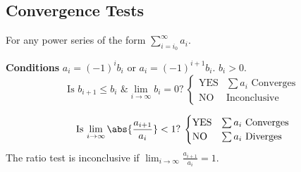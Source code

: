 \documentclass{article}
\begin{document}
\subsection{Convergence Tests}
For any power series of the form \(\displaystyle\sum_{i=i_0}^\infty
a_i\).
\begin{tcolorboxlarge}[title={Alternating Series}]
    \textbf{Conditions} \(a_i = \left( -1 \right)^i b_i\) or
    \(a_i = \left( -1 \right)^{i+1} b_i\). \(b_i>0\).
    \begin{equation*}
        \text{Is \(b_{i+1}\leqslant b_i\) \& \(\lim_{i\to\infty}b_i=0\)?}\:
        \begin{cases}
            \text{YES} & \text{\(\sum a_i\) Converges} \\
            \text{NO}  & \text{Inconclusive}
        \end{cases}
    \end{equation*}
\end{tcolorboxlarge}
\begin{tcolorboxlarge}[title={Ratio Test}]
    \begin{equation*}
        \text{Is \(\lim_{i\to\infty}\abs{\frac{a_{i+1}}{a_i}} < 1\)?}\:
        \begin{cases}
            \text{YES} & \text{\(\sum a_i\) Converges} \\
            \text{NO}  & \text{\(\sum a_i\) Diverges}
        \end{cases}
    \end{equation*}
    The ratio test is inconclusive if
    \(\displaystyle \lim_{i\to\infty}\frac{a_{i+1}}{a_i} = 1\).
\end{tcolorboxlarge}
\end{document}
